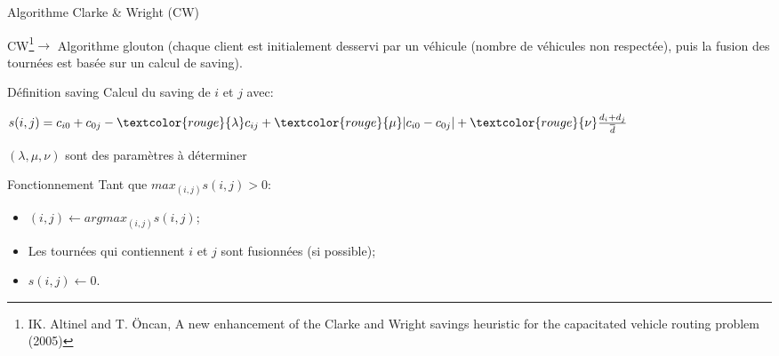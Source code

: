 \documentclass{beamer}
\begin{document}
\begin{frame}{Algorithme Clarke \& Wright (CW)}

CW\footnote{IK. Altinel and T. Öncan, A new enhancement of the Clarke and Wright savings heuristic for the capacitated vehicle routing problem (2005)}$\rightarrow$ Algorithme glouton (chaque client est initialement desservi par un véhicule (nombre de véhicules non respectée), puis la fusion des tournées est basée sur un calcul de saving). 



\begin{exampleblock}{Définition saving}
Calcul du saving de $i$ et $j$ avec:

\centering
$s(i,j) = c_{i0} + c_{0j} - \textcolor{rouge}{\lambda} c_{ij} + \textcolor{rouge}{\mu} \vert c_{i0} - c_{0j} \vert + \textcolor{rouge}{\nu} \frac{d_i + d_j}{\overline{d}}$

\textcolor{rouge}{$(\lambda,\mu,\nu)$ sont des paramètres à déterminer}
\end{exampleblock}

\begin{block}{Fonctionnement}
Tant que $max_{(i,j)}s(i,j) > 0$:
\begin{itemize}
\item $(i,j) \leftarrow argmax_{(i,j)}s(i,j)$;
\item Les tournées qui contiennent $i$ et $j$ sont fusionnées (si possible);
\item $s(i,j) \leftarrow  0$.
\end{itemize} 

\end{block}
\end{frame}
\end{document}
